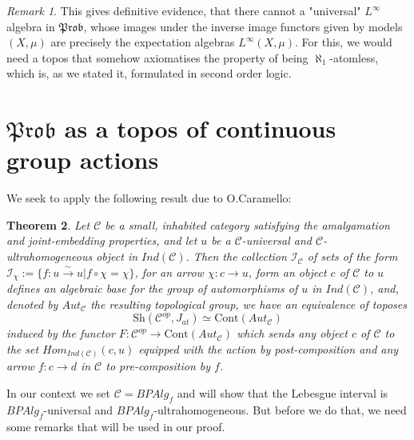 \documentclass[a4paper]{amsproc}
\theoremstyle{plain}
\newtheorem{theorem}{Theorem}[section]
\theoremstyle{definition}
\theoremstyle{remark}
\newtheorem{remark}[theorem]{Remark}
\numberwithin{equation}{section}
\begin{document}
\begin{remark} This gives definitive evidence, that there cannot a "universal" $L^\infty$ algebra in $\mathfrak{Prob}$, whose images under the inverse image functors given by models $(X,\mu)$ are precisely the expectation algebras $L^\infty(X,\mu)$. For this, we would need a topos that somehow axiomatises the property of being $\aleph_1$-atomless, which is, as we stated it, formulated in second order logic.
\end{remark}
\section{$\mathfrak{Prob}$ as a topos of continuous group actions}

We seek to apply the following result due to O.Caramello:

\begin{theorem}\label{olivia}
Let $\mathcal{C}$ be a small, inhabited category satisfying the amalgamation and joint-embedding properties, and let $u$ be a $\mathcal{C}$-universal and $\mathcal{C}$-ultrahomogeneous object in $Ind(\mathcal{C})$. Then the collection $\mathcal{I}_{\mathcal{C}}$ of sets of the form $\mathcal{I}_{\chi}:=\{f:u\overset{\sim}{\rightarrow} u| f\circ \chi=\chi\} $, for an arrow $\chi:c\rightarrow u$, form an object $c$ of $\mathcal{C}$ to $u$ defines an algebraic base for the group of automorphisms of $u$ in $Ind(\mathcal{C})$, and, denoted by $Aut_\mathcal{C}$ the resulting topological group, we have an equivalence of toposes
\[\text{Sh}(\mathcal{C}^{op},J_{at})\simeq \text{Cont}(Aut_\mathcal{C}) \]
induced by the functor $F:\mathcal{C}^{op}\rightarrow \text{Cont}(Aut_{\mathcal{C}})$ which sends any object $c$ of $\mathcal{C}$ to the set $Hom_{Ind(\mathcal{C})}(c,u)$ equipped with the action by post-composition and any arrow $f:c\rightarrow d$ in $\mathcal{C}$ to pre-composition by $f$.
\end{theorem}

In our context we set $\mathcal{C}=BPAlg_f$ and will show that the Lebesgue interval is $BPAlg_f$-universal and $BPAlg_f$-ultrahomogeneous. But before we do that, we need some remarks that will be used in our proof.
\end{document}
